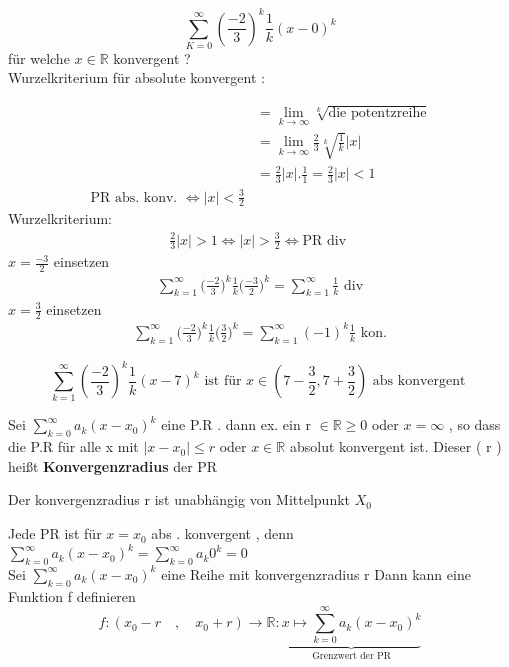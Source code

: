 \begin{example}
$$ \sum_{K=0}^{\infty}{(\frac{-2}{3})^k}\frac{1}{k}(x-0)^k $$
für welche $ x \in \mathbb{R} $ konvergent ?\\
Wurzelkriterium für absolute konvergent : 

\begin{align*}
&= \lim_{k \to \infty}{\sqrt[k]{\text{die potentzreihe}}} \\ &= 
\lim_{k \to \infty}{\frac{2}{3} \sqrt[k]{\frac{1}{k}}}|x| \\ &= 
\frac{2}{3}|x|.\frac{1}{1}=\frac{2}{3}|x|<1\\
\text{PR  abs. konv. } \Leftrightarrow |x| < \frac{3}{2}
\end{align*}
Wurzelkriterium:
\begin{gather*}
\frac{2}{3}|x|>1 \Leftrightarrow |x|
> \frac{3}{2} \Leftrightarrow \text{PR div } 
\end{gather*}
$ x = \frac{-3}{2} $ einsetzen  
\begin{gather*}
\sum_{k=1}^{\infty}{\big(\frac{-2}{3}\big)^k} \frac{1}{k} \big( \frac{-3}{2} \big)^k = \sum_{k=1}^{\infty}{\frac{1}{k}} \text{ div}
\end{gather*}
$ x = \frac{3}{2} $ einsetzen  
\begin{gather*}
\sum_{k=1}^{\infty}{\big(\frac{-2}{3}\big)^k} \frac{1}{k} \big( \frac{3}{2} \big)^k = \sum_{k=1}^{\infty}{(-1)^k} \frac{1}{k} \text{ kon.}
\end{gather*}

\end{example}

\begin{example}
\[ \sum_{k=1}^{\infty}{(\frac{-2}{3})^k} \frac{1}{k} (x-7)^k  \text{ ist für } x \in (7- \frac{3}{2}, 7 + \frac{3}{2}) \text{ abs konvergent }\]
\end{example}

\begin{definition}
Sei $\sum_{k=0}^{\infty}{a_k(x-x_0)^k}$ eine P.R . dann ex. ein r $\in \mathbb{R} \geq 0 $ oder $ x = \infty $ , so dass die P.R für alle x mit $ |x-x_0| \leq r $ oder $x \in \mathbb{R} $ absolut konvergent ist. Dieser ( r )  heißt \textbf{Konvergenzradius} der PR
\end{definition}

\begin{remark}
Der konvergenzradius r ist unabhängig von Mittelpunkt $X_0$  
\end{remark}

\begin{remark}
Jede PR ist für $x = x_0$ abs . konvergent , denn $\sum_{k=0}^{\infty}{a_k(x-x_0)^k} = \sum_{k=0}^{\infty}{a_k 0^k} = 0$\\
Sei $\sum_{k=0}^{\infty}{a_k(x-x_0)^k}$ eine Reihe mit konvergenzradius r Dann kann eine Funktion f definieren \\
 \[f : ( x_0 - r \quad ,\quad x_0 +r ) \rightarrow \mathbb{R} : \underbrace{x \longmapsto \sum_{k=0}^{\infty}{a_k(x-x_0)^k}}_{\text{Grenzwert der PR}}  \]
\end{remark} 

